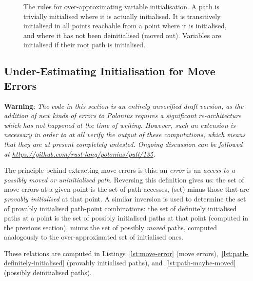 \documentclass[11pt,a4paper,twoside,openany,draft]{report}
\begin{document}
\begin{figure}
\caption[Rules for Over-Approximating Variable Initialisation]{The rules for
  over-approximating variable initialisation. A path is trivially initialised
  where it is actually initialised. It is transitively initialised in all points
  reachable from a point where it is initialised, and where it has not been
  deinitialised (moved out). Variables are initialised if their root path is
  initialised.}\label{fig:var-initialised}
\end{figure}

\subsection{Under-Estimating Initialisation for Move
  Errors}\label{sec:move-errors}
\textbf{Warning}: \textit{The code in this section is an entirely unverified
  draft version, as the addition of new kinds of errors to Polonius requires a
  significant re-architecture which has not happened at the time of writing.
  However, such an extension is necessary in order to at all verify the output
  of these computations, which means that they are at present completely
  untested. Ongoing discussion can be followed at
  \url{https://github.com/rust-lang/polonius/pull/135}.}

The principle behind extracting move errors is this: an \textit{error} is an
\textit{access to a possibly moved or uninitialised path}. Reversing this
definition gives us: the set of move errors at a given point is the set of path
accesses, (set) minus those that are \textit{provably initialised} at that
point. A similar inversion is used to determine the set of provably initialised
path-point combinations: the set of definitely initialised paths at a point is
the set of possibly initialised paths at that point (computed in the previous
section), minus the set of possibly \textit{moved} paths, computed analogously
to the over-approximated set of initialised ones.

These relations are computed in Listings~\ref{lst:move-error} (move
errors),~\ref{lst:path-definitely-initialised} (provably initialised paths),
and~\ref{lst:path-maybe-moved} (possibly deinitialised paths).
\end{document}

